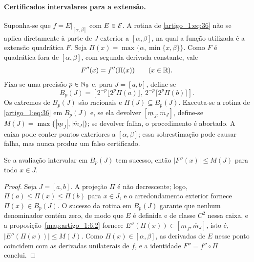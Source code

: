 \paragraph{Certificados intervalares para a extensão.}
Suponha-se que $f=E|_{[\alpha,\beta]}$ com $E\in\mathcal E$. A rotina de \eqref{artigo_1:eq:36} não se aplica diretamente à parte de $J$ exterior a $[\alpha,\beta]$, na qual a função utilizada é a extensão quadrática $F$. Seja $\Pi(x)=\max\{\alpha,\min\{x,\beta\}\}$. Como $F$ é quadrática fora de $[\alpha,\beta]$, com segunda derivada constante, vale
\[
F''(x)=f''(\Pi(x))\qquad(x\in\mathbb R).
\]
Fixa-se uma precisão $p\in\mathbb{N}_0$ e, para $J=[a,b]$, define-se
\[
B_p(J)=\left[2^{-p}\lfloor2^p\Pi(a)\rfloor,\ 2^{-p}\lceil2^p\Pi(b)\rceil\right].
\]
Os extremos de $B_p(J)$ são racionais e $\Pi(J)\subseteq B_p(J)$. Executa-se a rotina de \eqref{artigo_1:eq:36} em $B_p(J)$ e, se ela devolver $[\underline m_J,\overline m_J]$, define-se $M(J)=\max\{|\underline m_J|,|\overline m_J|\}$; se devolver falha, o procedimento é abortado. A caixa pode conter pontos exteriores a $[\alpha,\beta]$; essa sobrestimação pode causar falha, mas nunca produz um falso certificado.
\begin{lemaSN}
Se a avaliação intervalar em $B_p(J)$ tem sucesso, então $|F''(x)|\le M(J)$ para todo $x\in J$.
\end{lemaSN}
\begin{proof}
Seja $J=[a,b]$. A projeção $\Pi$ é não decrescente; logo, $\Pi(a)\le\Pi(x)\le\Pi(b)$ para $x\in J$, e o arredondamento exterior fornece $\Pi(x)\in B_p(J)$. O sucesso da rotina em $B_p(J)$ garante que nenhum denominador contém zero, de modo que $E$ é definida e de classe $C^2$ nessa caixa, e a proposição~\ref{map:artigo_1:6.2} fornece $E''(\Pi(x))\in[\underline m_J,\overline m_J]$, isto é, $|E''(\Pi(x))|\le M(J)$. Como $\Pi(x)\in[\alpha,\beta]$, as derivadas de $E$ nesse ponto coincidem com as derivadas unilaterais de $f$, e a identidade $F''=f''\circ\Pi$ conclui.
\end{proof}

